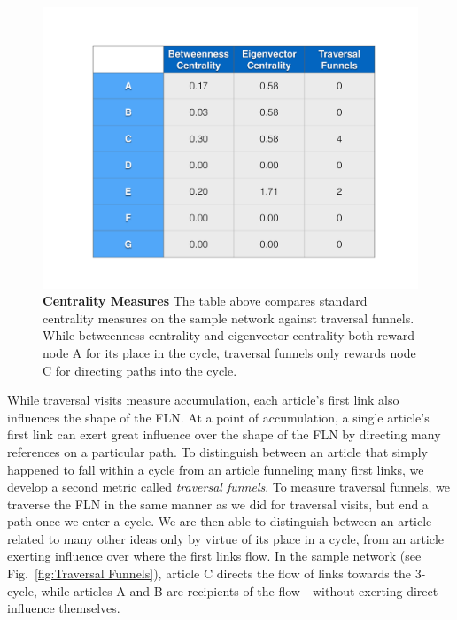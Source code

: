\documentclass[pre,twocolumn,twoside,superscriptaddress,floatfix]{revtex4-1}
\begin{document}
{\begin{figure}[tp!]
  \includegraphics[width=\columnwidth]{fig004_centrality_measures.pdf}
  \caption{
    \textbf{Centrality Measures}
    The table above compares standard centrality measures on the sample network against traversal funnels. While betweenness centrality and eigenvector centrality both reward node A for its place in the cycle, traversal funnels only rewards node C for directing paths into the cycle. }
  \label{fig:Centrality Measures}

\end{figure}

While traversal visits measure accumulation, each article's first link also 
influences the shape of the FLN. 
At a point of accumulation, a single article's first link 
can exert great influence over the shape of the FLN by directing many
references on a particular path. To distinguish between an article 
that simply happened to fall within a cycle from an article funneling 
many first links, we develop a second metric called {\it traversal funnels}.
To measure traversal funnels, we traverse the FLN in the same manner as we 
did for traversal visits, but end a path once we enter a cycle.
We are then able to distinguish between an article related to many other ideas
only by virtue of its place in a cycle, from an article exerting influence over where the first links flow. 
In the sample network 
(see Fig.~\ref{fig:Traversal Funnels}), article C 
directs the flow of links towards the 3-cycle, while articles A and B are 
recipients of the flow---without exerting direct influence themselves. 

}
\end{document}
